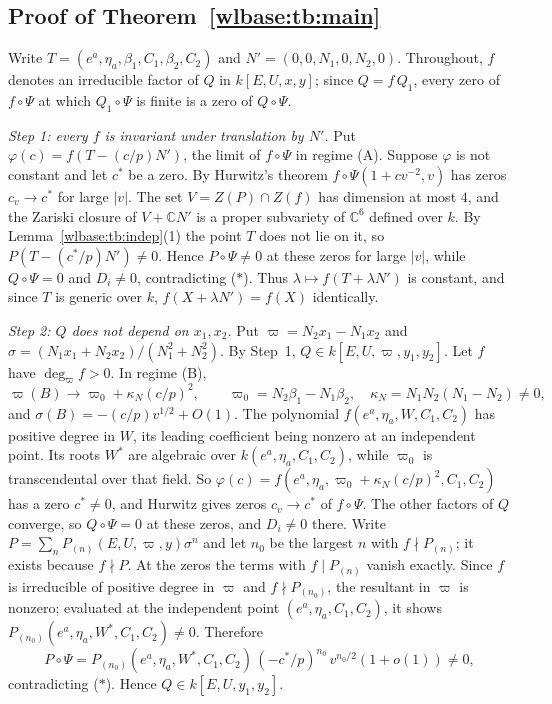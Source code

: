\documentclass[11pt,a4paper]{article}
\theoremstyle{definition}\newtheorem{definition}[theorem]{Definition}
\theoremstyle{remark}\newtheorem{remark}[theorem]{Remark}
\newcommand{\C}{\mathbb C}\newcommand{\Z}{\mathbb Z}
\begin{document}
\subsection{Proof of Theorem~\ref{wlbase:tb:main}}
Write $T=(e^a,\eta_a,\beta_1,C_1,\beta_2,C_2)$ and $N'=(0,0,N_1,0,N_2,0)$.
Throughout, $f$ denotes an irreducible factor of $Q$ in $k[E,U,x,y]$; since
$Q=f\,Q_1$, every zero of $f\circ\Psi$ at which $Q_1\circ\Psi$ is finite is a
zero of $Q\circ\Psi$.

\emph{Step 1: every $f$ is invariant under translation by $N'$.} Put
$\varphi(c)=f(T-(c/p)N')$, the limit of $f\circ\Psi$ in regime (A). Suppose
$\varphi$ is not constant and let $c^*$ be a zero. By Hurwitz's theorem
$f\circ\Psi(1+cv^{-2},v)$ has zeros $c_v\to c^*$ for large $|v|$. The set
$V=Z(P)\cap Z(f)$ has dimension at most $4$, and the Zariski closure of
$V+\C N'$ is a proper subvariety of $\C^6$ defined over $k$. By
Lemma~\ref{wlbase:tb:indep}(1) the point $T$ does not lie on it, so
$P(T-(c^*/p)N')\ne0$. Hence $P\circ\Psi\ne0$ at these zeros for large $|v|$,
while $Q\circ\Psi=0$ and $D_i\ne0$, contradicting ($\ast$). Thus
$\lambda\mapsto f(T+\lambda N')$ is constant, and since $T$ is generic over
$k$, $f(X+\lambda N')=f(X)$ identically.

\emph{Step 2: $Q$ does not depend on $x_1,x_2$.} Put $\varpi=N_2x_1-N_1x_2$ and
$\sigma=(N_1x_1+N_2x_2)/(N_1^2+N_2^2)$. By Step~1,
$Q\in k[E,U,\varpi,y_1,y_2]$. Let $f$ have $\deg_{\varpi}f>0$. In regime (B),
\[
 \varpi(B)\to \varpi_0+\kappa_N(c/p)^2,\qquad
 \varpi_0=N_2\beta_1-N_1\beta_2,\quad \kappa_N=N_1N_2(N_1-N_2)\ne0,
\]
and $\sigma(B)=-(c/p)v^{1/2}+O(1)$. The polynomial
$f(e^a,\eta_a,W,C_1,C_2)$ has positive degree in $W$, its leading coefficient
being nonzero at an independent point. Its roots $W^*$ are algebraic over
$k(e^a,\eta_a,C_1,C_2)$, while $\varpi_0$ is transcendental over that field.
So $\varphi(c)=f(e^a,\eta_a,\varpi_0+\kappa_N(c/p)^2,C_1,C_2)$ has a zero
$c^*\ne0$, and Hurwitz gives zeros $c_v\to c^*$ of $f\circ\Psi$. The other
factors of $Q$ converge, so $Q\circ\Psi=0$ at these zeros, and $D_i\ne0$
there. Write $P=\sum_nP_{(n)}(E,U,\varpi,y)\sigma^n$ and let $n_0$ be the
largest $n$ with $f\nmid P_{(n)}$; it exists because $f\nmid P$. At the zeros
the terms with $f\mid P_{(n)}$ vanish exactly. Since $f$ is irreducible of
positive degree in $\varpi$ and $f\nmid P_{(n_0)}$, the resultant in $\varpi$
is nonzero; evaluated at the independent point $(e^a,\eta_a,C_1,C_2)$, it shows
$P_{(n_0)}(e^a,\eta_a,W^*,C_1,C_2)\ne0$. Therefore
\[
 P\circ\Psi=P_{(n_0)}(e^a,\eta_a,W^*,C_1,C_2)\,(-c^*/p)^{n_0}\,v^{n_0/2}(1+o(1))\ne0,
\]
contradicting ($\ast$). Hence $Q\in k[E,U,y_1,y_2]$.
\end{document}
